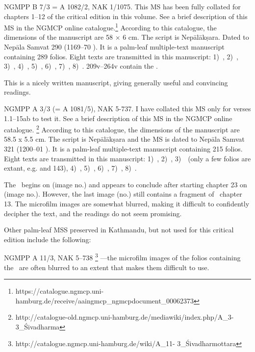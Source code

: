 NGMPP B 7/3 = A 1082/2, NAK 1/1075. This MS has been 
fully collated for chapters 1--12 of
the critical edition in this volume. See a brief description of this MS
in the NGMCP online catalogue.\footnote{https://catalogue.ngmcp.uni-hamburg.de/receive/aaingmcp\_ngmcpdocument\_00062373}
According to this catalogue, the dimensions of the manuscript are 
58 × 6 cm. The script is Nepālākṣara. Dated to Nepāla Samvat 
290 (1169--70 \CE). It is a
palm-leaf multiple-text manuscript containing 289 folios. Eight texts
are transmitted in this manuscript: 
1)~\SDhS,
2)~\SDhU,
3)~\SDhSangr,
4)~\Ums,
5)~\SivaUp,
6)~\Vss,
7)~\Uums,
8)~\DharmP.
\Fols209v--264v contain the \VSS.

This is a nicely written manuscript, giving generally useful and
convincing readings. 


NGMPP A 3/3 (= A 1081/5), NAK 5-737. I have collated 
this MS only for verses 1.1--15ab to test it. 
See a brief description of this MS in the NGMCP online
catalogue.%
	\footnote{http://catalogue-old.ngmcp.uni-hamburg.de/mediawiki/index.php/A\_3-3\_Śivadharma} 
According to this catalogue, the dimensions of the manuscript are
58.5 x 5.5 cm. The script is Nepālākṣara and the MS is dated 
to Nepāla Samvat 321 (1200--01 \CE). It is a palm-leaf multiple-text manuscript containing 215 folios.
Eight texts are transmitted in this manuscript: 
1)~\SDhS,
2)~\SDhU,
3)~\SDhSangr\ (only a few folios are extant, e.g.  and 143), 
4)~\Ums,
5)~\SivaUp,
6)~\Uums,
7)~\Vss,
8)~\DharmP.

The \VSS\ begins on  (image no.) 
and appears to conclude after starting chapter 23 
on  (image no.). However, the last image 
(no.) still contains a fragment of \VSS\ chapter 13.
The microfilm images are somewhat blurred, 
making it difficult to confidently decipher the text,
and the readings do not seem promising.


\bigskip

\noindent
Other palm-leaf MSS preserved in Kathmandu, but not used for
this critical edition include the following:

NGMPP A 11/3, NAK 5--738%
	\footnote{http://catalogue.ngmcp.uni-hamburg.de/wiki/A\_11- 3\_Śivadharmottara}%
---the microfilm images of the folios containing the \VSS\ are often blurred to an extent that makes them
difficult to use.


